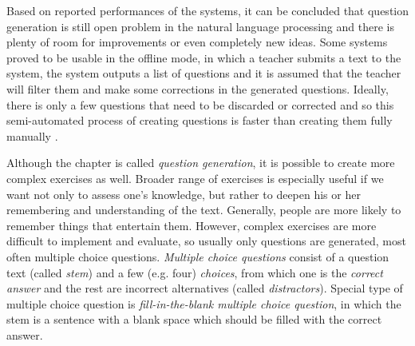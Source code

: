 \documentclass[12pt, twoside]{fithesis2}
\renewcommand{\_}{\leavevmode \kern0.07em\vbox{\hrule width0.4em}}
\newcounter{choice}
\begin{document}
Based on reported performances of the systems, it can be concluded that question generation is still open problem in the natural language processing and there is plenty of room for improvements or even completely new ideas.
Some systems proved to be usable in the offline mode, in which a teacher submits a text to the system,
the system outputs a list of questions and it is assumed that the teacher will filter them and make some corrections in the generated questions. Ideally, there is only a few questions that need to be discarded or corrected and so this semi-automated process of creating questions is faster than creating them fully manually
\cite{question-gen-mitkov}.

Although the chapter is called \textit{question generation},
it is possible to create more complex exercises as well.
Broader range of exercises is especially useful if we want not only to assess one's knowledge, but rather to deepen his or her remembering and understanding of the text.
Generally, people are more likely to remember things that entertain them.
However, complex exercises are more difficult to implement and evaluate,
so usually only questions are generated, most often multiple choice questions.
\textit{Multiple choice questions} consist of a question text (called \textit{stem})
and a few (e.g. four) \textit{choices}, from which one is the \textit{correct answer}
and the rest are incorrect alternatives (called \textit{distractors}).
Special type of multiple choice question is \textit{fill-in-the-blank multiple choice question},
in which the stem is a sentence with a blank space which should be filled with the correct answer.
\end{document}
